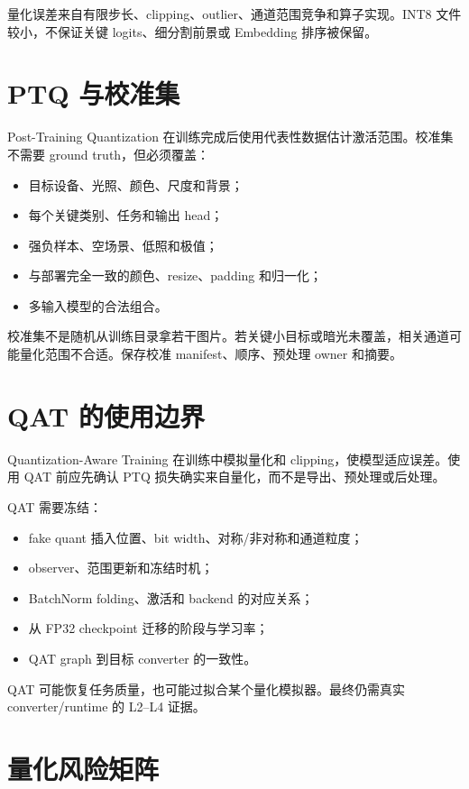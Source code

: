量化误差来自有限步长、clipping、outlier、通道范围竞争和算子实现。INT8 文件较小，不保证关键 logits、细分割前景或 Embedding 排序被保留。

\section{PTQ 与校准集}

Post-Training Quantization 在训练完成后使用代表性数据估计激活范围。校准集不需要 ground truth，但必须覆盖：

\begin{itemize}
  \item 目标设备、光照、颜色、尺度和背景；
  \item 每个关键类别、任务和输出 head；
  \item 强负样本、空场景、低照和极值；
  \item 与部署完全一致的颜色、resize、padding 和归一化；
  \item 多输入模型的合法组合。
\end{itemize}

校准集不是随机从训练目录拿若干图片。若关键小目标或暗光未覆盖，相关通道可能量化范围不合适。保存校准 manifest、顺序、预处理 owner 和摘要。

\section{QAT 的使用边界}

Quantization-Aware Training 在训练中模拟量化和 clipping，使模型适应误差。使用 QAT 前应先确认 PTQ 损失确实来自量化，而不是导出、预处理或后处理。

QAT 需要冻结：

\begin{itemize}
  \item fake quant 插入位置、bit width、对称/非对称和通道粒度；
  \item observer、范围更新和冻结时机；
  \item BatchNorm folding、激活和 backend 的对应关系；
  \item 从 FP32 checkpoint 迁移的阶段与学习率；
  \item QAT graph 到目标 converter 的一致性。
\end{itemize}

QAT 可能恢复任务质量，也可能过拟合某个量化模拟器。最终仍需真实 converter/runtime 的 L2--L4 证据。

\section{量化风险矩阵}

